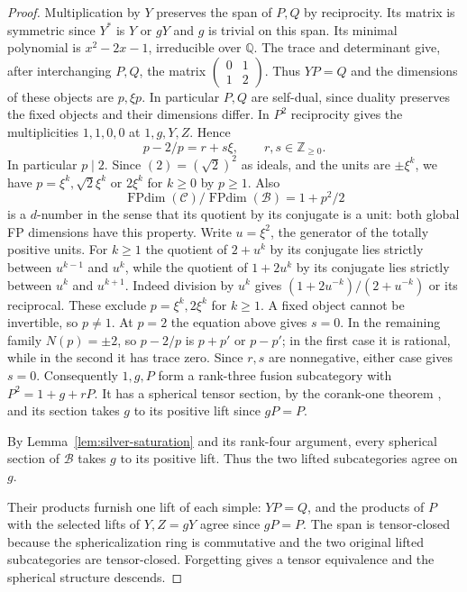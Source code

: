 \documentclass[11pt,reqno]{amsart}
\theoremstyle{remark}\newtheorem{remark}[theorem]{Remark}
\numberwithin{equation}{section}
\begin{document}
\begin{proof}
Multiplication by $Y$ preserves the span of $P,Q$ by reciprocity. Its matrix is symmetric since $Y^*$ is $Y$ or $gY$ and $g$ is trivial on this span. Its minimal polynomial is $x^2-2x-1$, irreducible over $\mathbb Q$. The trace and determinant give, after interchanging $P,Q$, the matrix $\left(\begin{smallmatrix}0&1\\1&2\end{smallmatrix}\right)$. Thus $YP=Q$ and the dimensions of these objects are $p,\xi p$. In particular $P,Q$ are self-dual, since duality preserves the fixed objects and their dimensions differ. In $P^2$ reciprocity gives the multiplicities $1,1,0,0$ at $1,g,Y,Z$. Hence
\[
 p-2/p=r+s\xi,\qquad r,s\in\mathbb Z_{\ge0}.
\]
In particular $p\mid2$. Since $(2)=(\sqrt2)^2$ as ideals, and the units are $\pm\xi^k$, we have $p=\xi^k,\sqrt2\xi^k$ or $2\xi^k$ for $k\ge0$ by $p\ge1$. Also
\[
 \operatorname{FPdim}(\mathcal C)/\operatorname{FPdim}(\mathcal B)=1+p^2/2
\]
is a $d$-number in the sense that its quotient by its conjugate is a unit: both global FP dimensions have this property. Write $u=\xi^2$, the generator of the totally positive units. For $k\ge1$ the quotient of $2+u^k$ by its conjugate lies strictly between $u^{k-1}$ and $u^k$, while the quotient of $1+2u^k$ by its conjugate lies strictly between $u^k$ and $u^{k+1}$. Indeed division by $u^k$ gives $(1+2u^{-k})/(2+u^{-k})$ or its reciprocal. These exclude $p=\xi^k,2\xi^k$ for $k\ge1$. A fixed object cannot be invertible, so $p\ne1$. At $p=2$ the equation above gives $s=0$. In the remaining family $N(p)=\pm2$, so $p-2/p$ is $p+p'$ or $p-p'$; in the first case it is rational, while in the second it has trace zero. Since $r,s$ are nonnegative, either case gives $s=0$. Consequently $1,g,P$ form a rank-three fusion subcategory with $P^2=1+g+rP$. It has a spherical tensor section, by the corank-one theorem \cite[Theorem~4.5]{DCW}, and its section takes $g$ to its positive lift since $gP=P$.

By Lemma~\ref{lem:silver-saturation} and its rank-four argument,
every spherical section of $\mathcal B$ takes $g$ to its positive
lift. Thus the two lifted subcategories agree on $g$.

Their products furnish one lift of each simple: $YP=Q$, and the products of $P$ with the selected lifts of $Y,Z=gY$ agree since $gP=P$. The span is tensor-closed because the sphericalization ring is commutative and the two original lifted subcategories are tensor-closed. Forgetting gives a tensor equivalence and the spherical structure descends.
\end{proof}
\end{document}
